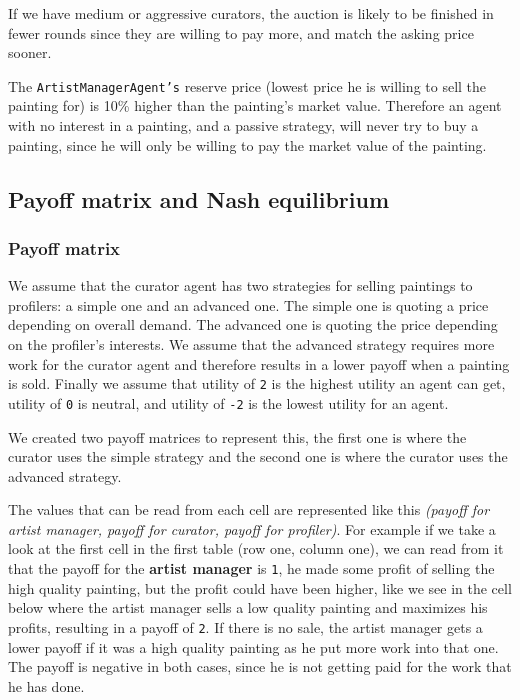 \documentclass[a4paper, 11pt]{article}
\begin{document}
If we have medium or aggressive curators, the auction is likely to be finished in fewer rounds since they are willing to pay more, and match the asking price sooner.

The \texttt{ArtistManagerAgent's} reserve price (lowest price he is willing to sell the painting for) is 10\% higher than the painting's market value. Therefore an agent with no interest in a painting, and a passive strategy, will never try to buy a painting, since he will only be willing to pay the market value of the painting.

\subsection{Payoff matrix and Nash equilibrium}

\subsubsection{Payoff matrix}

We assume that the curator agent has two strategies for selling paintings to profilers: a simple one and an advanced one. The simple one is quoting a price depending on overall demand. The advanced one is quoting the price depending on the profiler's interests. We assume that the advanced strategy requires more work for the curator agent and therefore results in a lower payoff when a painting is sold. Finally we assume that utility of \texttt{2} is the highest utility an agent can get, utility of \texttt{0} is neutral, and utility of \texttt{-2} is the lowest utility for an agent.

We created two payoff matrices to represent this, the first one is where the curator uses the simple strategy and the second one is where the curator uses the advanced strategy.

The values that can be read from each cell are represented like this \textit{(payoff for artist manager, payoff for curator, payoff for profiler)}. For example if we take a look at the first cell in the first table (row one, column one), we can read from it that the payoff for the \textbf{artist manager} is \texttt{1}, he made some profit of selling the high quality painting, but the profit could have been higher, like we see in the cell below where the artist manager sells a low quality painting and maximizes his profits, resulting in a payoff of \texttt{2}. If there is no sale, the artist manager gets a lower payoff if it was a high quality painting as he put more work into that one. The payoff is negative in both cases, since he is not getting paid for the work that he has done.
\end{document}
